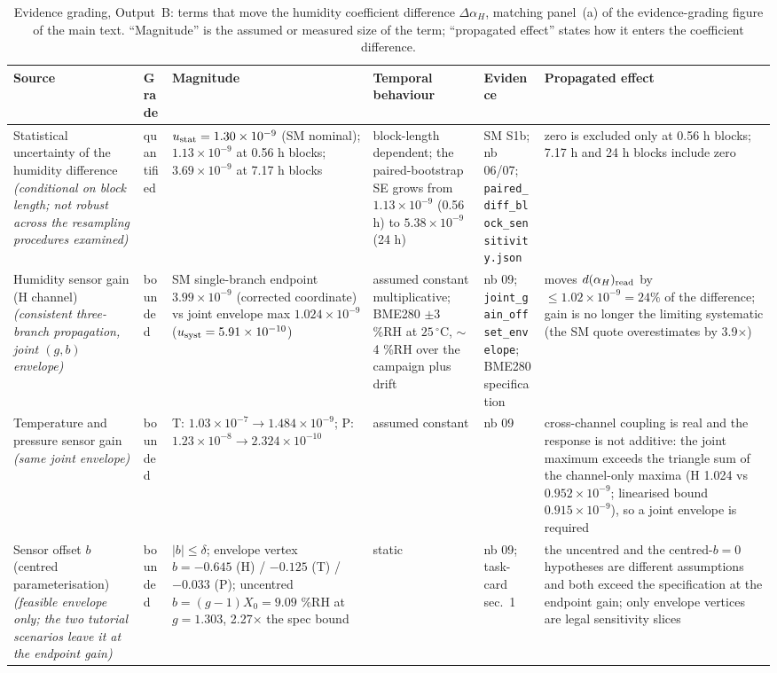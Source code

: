 \begin{table}[htbp]
\centering
\caption{Evidence grading, Output~B: terms that move the humidity coefficient difference $\Delta\alpha_H$, matching panel~(a) of the evidence-grading figure of the main text. ``Magnitude'' is the assumed or measured size of the term; ``propagated effect'' states how it enters the coefficient difference.}
\label{tab:S4b}
\footnotesize
\setlength{\tabcolsep}{4pt}
\begin{tabular}{@{}p{}p{}p{}p{}p{}p{}@{}}
\hline
\textbf{Source} & \textbf{Grade} & \textbf{Magnitude} & \textbf{Temporal behaviour} & \textbf{Evidence} & \textbf{Propagated effect} \\
\hline
Statistical uncertainty of the humidity difference \emph{(conditional on block length; not robust across the resampling procedures examined)} & quantified & $u_{\rm stat} = 1.30\times10^{-9}$ (SM nominal); $1.13\times10^{-9}$ at 0.56 h blocks; $3.69\times10^{-9}$ at 7.17 h blocks & block-length dependent; the paired-bootstrap SE grows from $1.13\times10^{-9}$ (0.56 h) to $5.38\times10^{-9}$ (24 h) & SM S1b; nb 06/07; \texttt{paired\_diff\_block\_sensitivity.json} & zero is excluded only at 0.56 h blocks; 7.17 h and 24 h blocks include zero \\
Humidity sensor gain (H channel) \emph{(consistent three-branch propagation, joint $(g,b)$ envelope)} & bounded & SM single-branch endpoint $3.99\times10^{-9}$ (corrected coordinate) vs joint envelope max $1.024\times10^{-9}$ ($u_{\rm syst} = 5.91\times10^{-10}$) & assumed constant multiplicative; BME280 $\pm$3 \%RH at $25\,^\circ$C, $\sim$4 \%RH over the campaign plus drift & nb 09; \texttt{joint\_gain\_offset\_envelope}; BME280 specification & moves $d(\alpha_H)_{\rm read}$ by $\leq 1.02\times10^{-9} = 24\%$ of the difference; gain is no longer the limiting systematic (the SM quote overestimates by 3.9$\times$) \\
Temperature and pressure sensor gain \emph{(same joint envelope)} & bounded & T: $1.03\times10^{-7} \to 1.484\times10^{-9}$; P: $1.23\times10^{-8} \to 2.324\times10^{-10}$ & assumed constant & nb 09 & cross-channel coupling is real and the response is not additive: the joint maximum exceeds the triangle sum of the channel-only maxima (H 1.024 vs $0.952\times10^{-9}$; linearised bound $0.915\times10^{-9}$), so a joint envelope is required \\
Sensor offset $b$ (centred parameterisation) \emph{(feasible envelope only; the two tutorial scenarios leave it at the endpoint gain)} & bounded & $|b| \leq \delta$; envelope vertex $b = -0.645$ (H) / $-0.125$ (T) / $-0.033$ (P); uncentred $b = (g-1)X_0 = 9.09$ \%RH at $g = 1.303$, 2.27$\times$ the spec bound & static & nb 09; task-card sec.~1 & the uncentred and the centred-$b=0$ hypotheses are different assumptions and both exceed the specification at the endpoint gain; only envelope vertices are legal sensitivity slices \\

\end{tabular}
\end{table}
